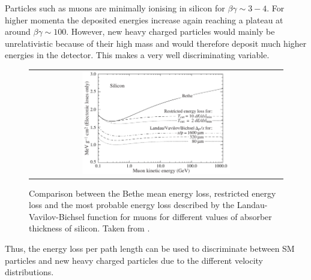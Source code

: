 Particles such as  muons are minimally ionising in silicon for $\beta\gamma \sim 3-4$. 
For higher momenta the deposited energies increase again reaching a plateau at around $\beta\gamma\sim100$. 
However, new heavy charged particles would mainly be unrelativistic because of their high mass and would therefore deposit much higher energies in the detector.
This makes \dedx  a very well discriminating variable.
\begin{figure}[!t]
  \centering 
  \begin{tabular}{c}
  \includegraphics[width=0.6\textwidth]{figures/analysis/dEdx_Bethe_Landau.png}
  \end{tabular}
  \caption{Comparison between the Bethe mean energy loss, restricted energy loss and the most probable energy loss described by the Landau-Vavilov-Bichsel function for muons for different values of absorber thickness of silicon. Taken from \cite{bib:PDG_2014}.} 
  \label{fig:dEdx_Bethe_Landau}
\end{figure}
Thus, the energy loss per path length can be used to discriminate between SM particles and new heavy charged particles due to the different velocity distributions.\\

